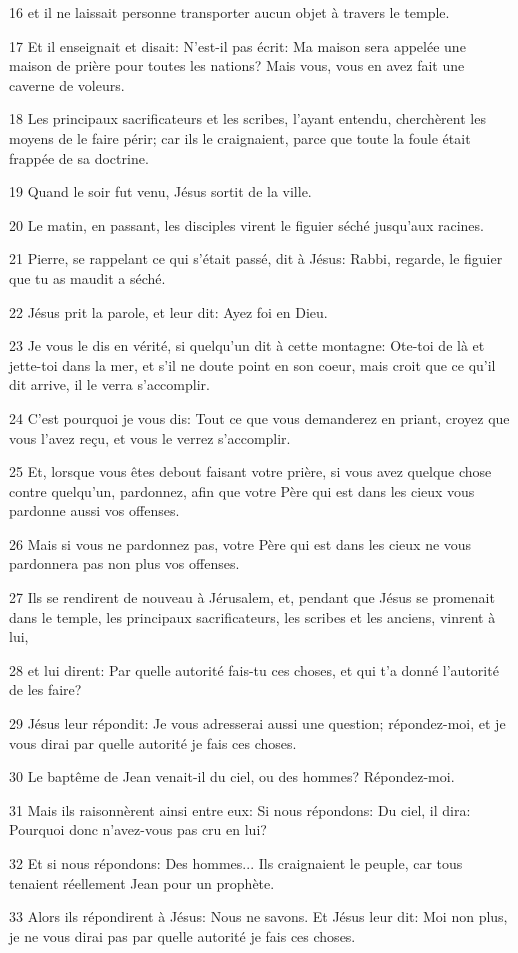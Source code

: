 \par 16 et il ne laissait personne transporter aucun objet à travers le temple.
\par 17 Et il enseignait et disait: N'est-il pas écrit: Ma maison sera appelée une maison de prière pour toutes les nations? Mais vous, vous en avez fait une caverne de voleurs.
\par 18 Les principaux sacrificateurs et les scribes, l'ayant entendu, cherchèrent les moyens de le faire périr; car ils le craignaient, parce que toute la foule était frappée de sa doctrine.
\par 19 Quand le soir fut venu, Jésus sortit de la ville.
\par 20 Le matin, en passant, les disciples virent le figuier séché jusqu'aux racines.
\par 21 Pierre, se rappelant ce qui s'était passé, dit à Jésus: Rabbi, regarde, le figuier que tu as maudit a séché.
\par 22 Jésus prit la parole, et leur dit: Ayez foi en Dieu.
\par 23 Je vous le dis en vérité, si quelqu'un dit à cette montagne: Ote-toi de là et jette-toi dans la mer, et s'il ne doute point en son coeur, mais croit que ce qu'il dit arrive, il le verra s'accomplir.
\par 24 C'est pourquoi je vous dis: Tout ce que vous demanderez en priant, croyez que vous l'avez reçu, et vous le verrez s'accomplir.
\par 25 Et, lorsque vous êtes debout faisant votre prière, si vous avez quelque chose contre quelqu'un, pardonnez, afin que votre Père qui est dans les cieux vous pardonne aussi vos offenses.
\par 26 Mais si vous ne pardonnez pas, votre Père qui est dans les cieux ne vous pardonnera pas non plus vos offenses.
\par 27 Ils se rendirent de nouveau à Jérusalem, et, pendant que Jésus se promenait dans le temple, les principaux sacrificateurs, les scribes et les anciens, vinrent à lui,
\par 28 et lui dirent: Par quelle autorité fais-tu ces choses, et qui t'a donné l'autorité de les faire?
\par 29 Jésus leur répondit: Je vous adresserai aussi une question; répondez-moi, et je vous dirai par quelle autorité je fais ces choses.
\par 30 Le baptême de Jean venait-il du ciel, ou des hommes? Répondez-moi.
\par 31 Mais ils raisonnèrent ainsi entre eux: Si nous répondons: Du ciel, il dira: Pourquoi donc n'avez-vous pas cru en lui?
\par 32 Et si nous répondons: Des hommes... Ils craignaient le peuple, car tous tenaient réellement Jean pour un prophète.
\par 33 Alors ils répondirent à Jésus: Nous ne savons. Et Jésus leur dit: Moi non plus, je ne vous dirai pas par quelle autorité je fais ces choses.

